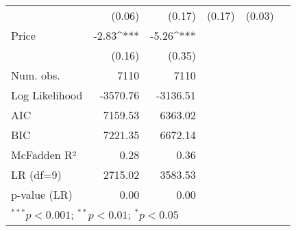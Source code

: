 \begin{table}[h]
\begin{center}
\begin{tabular}{l D{.}{.}{5.5} D{.}{.}{5.5} D{.}{.}{2.5} D{.}{.}{2.5} D{.}{.}{3.2}}
                                   & (0.06)      & (0.17)      & (0.17)      & (0.03)     &        \\
Price                              & -2.83^{***} & -5.26^{***} &             &            &        \\
                                   & (0.16)      & (0.35)      &             &            &        \\
\midrule
Num. obs.                          & 7110        & 7110        &             &            &        \\
Log Likelihood                     & -3570.76    & -3136.51    &             &            &        \\
AIC                                & 7159.53     & 6363.02     &             &            &        \\
BIC                                & 7221.35     & 6672.14     &             &            &        \\
McFadden R²                        & 0.28        & 0.36        &             &            &        \\
LR  (df=9)                       & 2715.02     & 3583.53     &             &            &        \\
p-value (LR)                       & 0.00        & 0.00        &             &            &        \\
\bottomrule
{}
\end{tabular}
\end{center}
\end{table}
